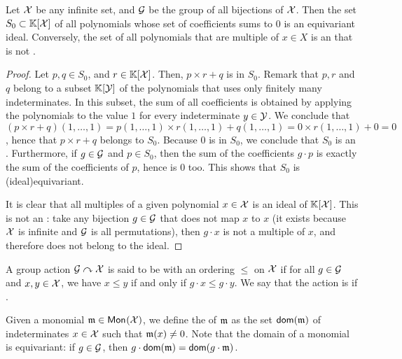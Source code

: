 \begin{example}
    \label{ex:idl-equiv}
    Let $\mathcal{X}$ be any infinite set, and $\mathcal{G}$ be the 
    group of all bijections of $\mathcal{X}$. 
    Then the set $S_0 \subset \mathbb{K}[\mathcal{X}]$ of all polynomials 
    whose set of coefficients sums to $0$ is an equivariant ideal.
    Conversely, the set of all polynomials that are multiple
    of $x \in X$ is an  that is not .
\end{example}
\begin{proof}
    Let $p,q\in S_0$, and $r \in \mathbb{K}[\mathcal{X}]$.
    Then, $p \times r + q$ is in $S_0$. Remark that 
    $p,r$ and $q$ belong to a subset $\mathbb{K}[\mathcal{Y}]$ of the 
    polynomials that uses only finitely many indeterminates.
    In this subset, the sum of all coefficients is obtained
    by applying the polynomials to the value $1$ for every indeterminate
    $y \in \mathcal{Y}$. We conclude that
    $(p \times r + q)(1,\dots, 1) 
    = p(1,\dots,1) \times r(1,\dots,1) + q(1,\dots,1)
    = 0 \times r(1, \dots, 1) + 0 = 0$, hence that
    $p \times r + q$ belongs to $S_0$. 
    Because $0$ is in $S_0$, we conclude that $S_0$ is an .
    Furthermore, if $g \in \mathcal{G}$ and $p \in S_0$, then
    the sum of the coefficients $g \cdot p$ is exactly
    the sum of the coefficients of $p$, hence is $0$ too.
    This shows that $S_0$ is \kl(ideal){equivariant}.

    It is clear that all multiples of a given polynomial $x \in \mathcal{X}$
    is an ideal of $\mathbb{K}[\mathcal{X}]$. This is not an :
    take any bijection $g \in \mathcal{G}$ that does not map $x$ to $x$ (it
    exists because $\mathcal{X}$ is infinite and $\mathcal{G}$ is all permutations),
    then $g \cdot x$ is not a multiple of $x$, and therefore does 
    not belong to the ideal.
\end{proof}

\AP A group action $\mathcal{G} \curvearrowright \mathcal{X}$ is said to be  with an
ordering $\leq$ on $\mathcal{X}$ if for all $g \in \mathcal{G}$ and $x,y \in \mathcal{X}$, we have $x
\leq y$ if and only if $g \cdot x \leq g \cdot y$. We say that the action is
 if .

\AP Given a monomial $\monelt[m] \in \mon{\X}$, we define the  of
$\monelt[m]$ as the set $\dom(\monelt[m])$ of indeterminates $x \in \mathcal{X}$ such
that $\monelt[m](x) \neq 0$. Note that the domain of a monomial is equivariant:
if $g \in \mathcal{G}$, then $g \cdot \dom(\monelt[m]) = \dom(g \cdot \monelt[m])$.

